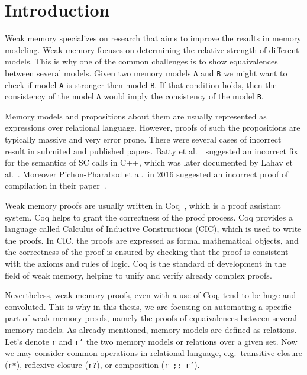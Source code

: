 \section{Introduction}
Weak memory specializes on research that aims to improve the results in memory modeling. Weak memory focuses on determining the relative strength of different models. This is why one of the common challenges is to show equaivalences between several models. Given two memory models \texttt{A} and \texttt{B} we might want to check if model \texttt{A} is stronger then model \texttt{B}. If that condition holds, then the consistency of the model \texttt{A} would imply the consistency of the model \texttt{B}.

Memory models and propositions about them are usually represented as expressions over relational language. However, proofs of such the propositions are typically massive and very error prone. There were several cases of incorrect result in submited and published papers. Batty et al.~\cite{batty_2016}\ suggested an incorrect fix for the semantics of SC calls in C++, which was later documented by Lahav et al.~\cite{lahav2017repairing}. Moreover Pichon-Pharabod et al.\  in 2016 suggested an incorrect proof of compilation in their paper~\cite{PichonPharabod_Sewell16}. 

Weak memory proofs are usually written in Coq~\cite{bertot2013interactive}, which is a proof assistant system. Coq helps to grant the correctness of the proof process. Coq provides a language called Calculus of Inductive Constructions (CIC), which is used to write the proofs. In CIC, the proofs are expressed as formal mathematical objects, and the correctness of the proof is ensured by checking that the proof is consistent with the axioms and rules of logic. Coq is the standard of development in the field of weak memory, helping to unify and verify already complex proofs. 

Nevertheless, weak memory proofs, even with a use of Coq, tend to be huge and convoluted. This is why in this thesis, we are focusing on automating a specific part of weak memory proofs, namely the proofs of equaivalences between several memory models. As already mentioned, memory models are defined as relations. Let's denote \texttt{r} and \texttt{r'} the two memory models or relations over a given set. Now we may consider common operations in relational language, e.g.\ transitive closure (\texttt{r*}), reflexive closure (\texttt{r?}), or composition (\texttt{r ;; r'}). 